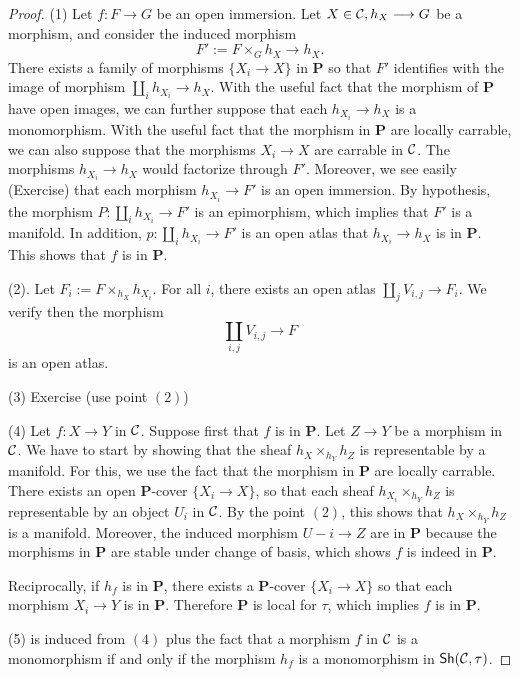 \documentclass{tufte-book} %
\numberwithin{dummy}{section}
\newcommand{\calc}{{\cal C}}
\newcommand{\lrta}{\longrightarrow}
\newcommand{\ssh}{\mathsf{Sh}}
\newcommand{\bfp}{\mathbf{P}}
\begin{document}
\begin{proof}(1)
Let $f:F\lrta G$ be an open immersion. Let $X\in \calc, h_X\lrta G$ be a morphism, and consider the induced morphism
$$
F':=F\times_G h_X\lrta h_X.
$$
There exists a family of morphisms $\{X_i\lrta X\}$ in $\bfp$ so that $F'$ identifies with the image of morphism $\coprod_i h_{X_i}\lrta h_X$. With the useful fact that the morphism of $\bfp$ have open images, we can further suppose that each $h_{X_i}\lrta h_X$ is a monomorphism. With the useful fact that the morphism in $\bfp$ are locally carrable, we can also suppose that the morphisms $X_i\lrta X$ are carrable in $\calc$. The morphisms $h_{X_i}\lrta h_X$ would factorize through $F'$. Moreover, we see easily (Exercise) that each morphism $h_{X_i}\lrta F'$ is an open immersion. By hypothesis, the morphism $P:\coprod_i h_{X_i}\lrta F'$ is an epimorphism, which implies that $F'$ is a manifold. In addition, $p:\coprod_i h_{X_i}\lrta F'$ is an open atlas that $h_{X_i}\lrta h_X$ is in $\bfp$. This shows that $f$ is in $\bfp$.

(2). Let $F_i:=F\times_{h_X}h_{X_i}$. For all $i$, there exists an open atlas $\coprod_j V_{i,j}\lrta F_i$. We verify then the morphism
$$
\coprod_{i,j}V_{i,j}\lrta F
$$
is an open atlas.

(3) Exercise (use point $(2)$)

(4) Let $f:X\lrta Y$ in $\calc$. Suppose first that $f$ is in $\bfp$. Let $Z\lrta Y$ be a morphism in $\calc$. We have to start by showing that the sheaf $h_X\times_{h_Y} h_Z$ is representable by a manifold. For this, we use the fact that the morphism in $\bfp$ are locally carrable. There exists an open $\bfp$-cover $\{X_i\lrta X\}$, so that each sheaf $h_{X_i}\times_{h_Y} h_Z$ is representable by an object $U_i$ in $\calc$. By the point $(2)$, this shows that $h_X\times_{h_Y} h_Z$ is a manifold. Moreover, the induced morphism $U-i\lrta Z$ are in $\bfp$ because the morphisms in $\bfp$ are stable under change of basis, which shows $f$ is indeed in $\bfp$.

Reciprocally, if $h_f$ is in $\bfp$, there exists a $\bfp$-cover $\{X_i\lrta X\}$ so that each morphism $X_i\lrta Y$ is in $\bfp$. Therefore $\bfp$ is local for $\tau$, which implies $f$ is in $\bfp$.

(5) is induced from $(4)$ plus the fact that a morphism $f$ in $\calc$ is a monomorphism if and only if the morphism $h_f$ is a monomorphism in $\ssh(\calc,\tau)$.
\end{proof}
\end{document}
